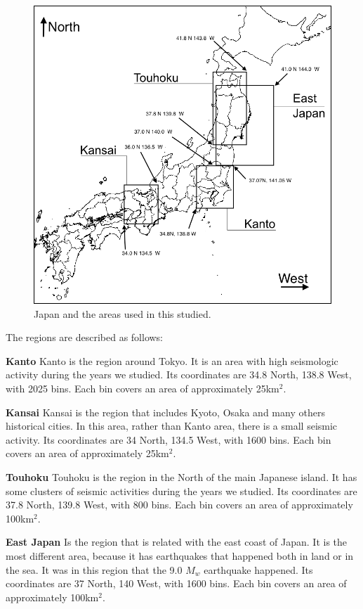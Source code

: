 \begin{figure}
	\centering
	\includegraphics[scale=0.25]{img/alljapan.png}
	\caption{Japan and the areas used in this studied.}
	\label{alljapan}
\end{figure}


The regions are described as follows:

\textbf{Kanto} Kanto is the region around Tokyo. It is an area with
high seismologic activity during the years we studied. Its coordinates
are 34.8 North, 138.8 West, with 2025 bins. Each bin covers an area of
approximately 25km$^2$.

\textbf{Kansai} Kansai is the region that includes Kyoto, Osaka and
many others historical cities. In this area, rather than Kanto area,
there is a small seismic activity. Its coordinates are 34 North, 134.5
West, with 1600 bins. Each bin covers an area of approximately
25km$^2$.

\textbf{Touhoku} Touhoku is the region in the North of the main
Japanese island. It has some clusters of seismic activities during the
years we studied. Its coordinates are 37.8 North, 139.8 West, with 800
bins. Each bin covers an area of approximately 100km$^2$.

\textbf{East Japan} Is the region that is related with the east coast
of Japan. It is the most different area, because it has earthquakes
that happened both in land or in the sea. It was in this region that
the 9.0 $M_w$ earthquake happened. Its coordinates are 37 North, 140
West, with 1600 bins. Each bin covers an area of approximately
100km$^2$.

